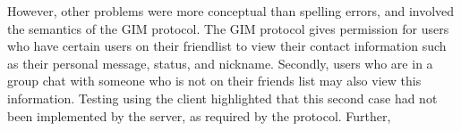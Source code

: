 However, other problems were more conceptual than spelling errors, and involved the semantics of the GIM protocol. The GIM protocol gives permission for users who have certain users on their friendlist to view their contact information such as their personal message, status, and nickname. Secondly, users who are in a group chat with someone who is not on their friends list may also view this information. Testing using the client highlighted that this second case had not been implemented by the server, as required by the protocol. Further, 
